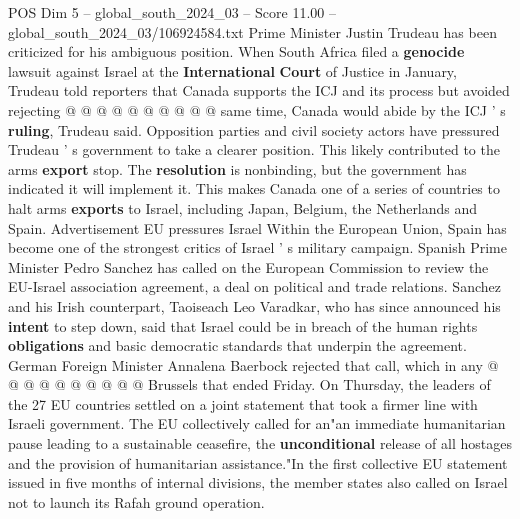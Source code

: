 \begin{textsample}{POS Dim 5 – global\_south\_2024\_03 – Score 11.00 – global\_south\_2024\_03/106924584.txt}
Prime Minister Justin Trudeau has been criticized for his ambiguous position.
When South Africa filed a \textbf{genocide} lawsuit against Israel at the \textbf{International} \textbf{Court} of Justice in January, Trudeau told reporters that Canada supports the ICJ and its process but avoided rejecting @ @ @ @ @ @ @ @ @ @ same time, Canada would abide by the ICJ ' s \textbf{ruling}, Trudeau said.
Opposition parties and civil society actors have pressured Trudeau ' s government to take a clearer position.
This likely contributed to the arms \textbf{export} stop.
The \textbf{resolution} is nonbinding, but the government has indicated it will implement it.
This makes Canada one of a series of countries to halt arms \textbf{exports} to Israel, including Japan, Belgium, the Netherlands and Spain.
Advertisement EU pressures Israel Within the European Union, Spain has become one of the strongest critics of Israel ' s military campaign.
Spanish Prime Minister Pedro Sanchez has called on the European Commission to review the EU-Israel association agreement, a deal on political and trade relations.
Sanchez and his Irish counterpart, Taoiseach Leo Varadkar, who has since announced his \textbf{intent} to step down, said that Israel could be in breach of the human rights \textbf{obligations} and basic democratic standards that underpin the agreement.
German Foreign Minister Annalena Baerbock rejected that call, which in any @ @ @ @ @ @ @ @ @ @ Brussels that ended Friday.
On Thursday, the leaders of the 27 EU countries settled on a joint statement that took a firmer line with Israeli government.
The EU collectively called for an"an immediate humanitarian pause leading to a sustainable ceasefire, the \textbf{unconditional} release of all hostages and the provision of humanitarian assistance."In the first collective EU statement issued in five months of internal divisions, the member states also called on Israel not to launch its Rafah ground operation.

\end{textsample}
